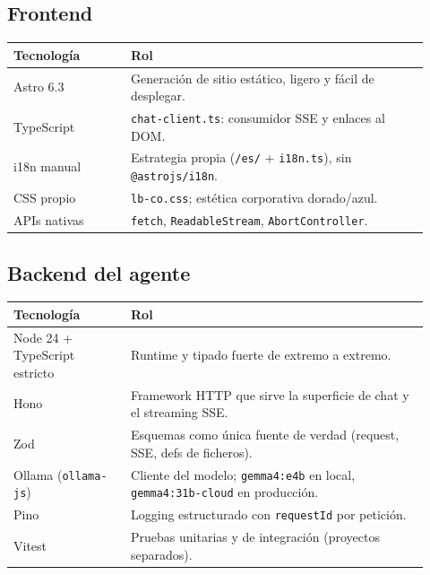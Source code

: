 \documentclass[11pt,a4paper]{article}
\newcommand{\code}[1]{\texttt{\small #1}}
\begin{document}
\subsection{Frontend}

\begin{center}
\renewcommand{\arraystretch}{1.25}
\begin{tabular}{@{}p{0.26\linewidth}p{0.66\linewidth}@{}}
\toprule
\textbf{Tecnología} & \textbf{Rol} \\
\midrule
Astro 6.3 & Generación de sitio estático, ligero y fácil de desplegar. \\
TypeScript & \code{chat-client.ts}: consumidor SSE y enlaces al DOM. \\
i18n manual & Estrategia propia (\code{/es/} + \code{i18n.ts}), sin
\code{@astrojs/i18n}. \\
CSS propio & \code{lb-co.css}; estética corporativa dorado/azul. \\
APIs nativas & \code{fetch}, \code{ReadableStream}, \code{AbortController}. \\
\bottomrule
\end{tabular}
\end{center}

\subsection{Backend del agente}

\begin{center}
\renewcommand{\arraystretch}{1.25}
\begin{tabular}{@{}p{0.26\linewidth}p{0.66\linewidth}@{}}
\toprule
\textbf{Tecnología} & \textbf{Rol} \\
\midrule
Node 24 + TypeScript estricto & Runtime y tipado fuerte de extremo a extremo. \\
Hono & Framework HTTP que sirve la superficie de chat y el streaming SSE. \\
Zod & Esquemas como única fuente de verdad (request, SSE, defs de ficheros). \\
Ollama (\code{ollama-js}) & Cliente del modelo; \code{gemma4:e4b} en local,
\code{gemma4:31b-cloud} en producción. \\
Pino & Logging estructurado con \code{requestId} por petición. \\
Vitest & Pruebas unitarias y de integración (proyectos separados). \\
\bottomrule
\end{tabular}
\end{center}
\end{document}
